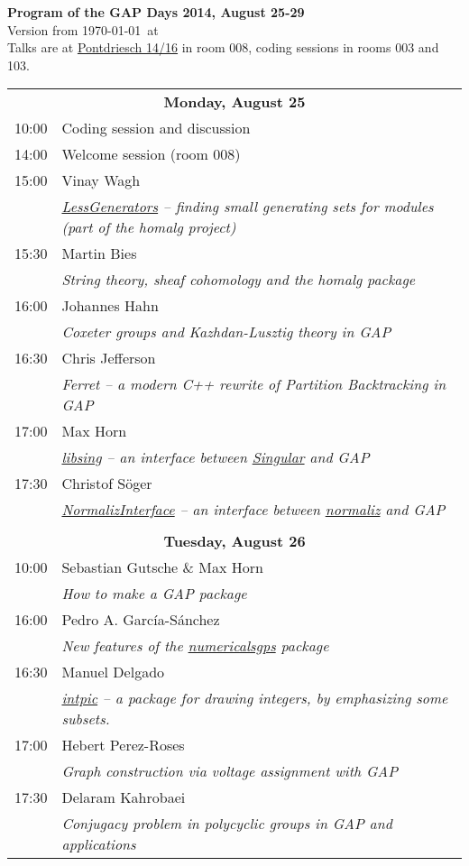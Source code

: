 \documentclass[12pt,a4paper]{article}
\begin{document}
\begin{center}
{\huge\textbf{Program of the GAP Days 2014, August 25-29}\\[2mm]}
Version from \today\ at \currenttime\\[2mm]
Talks are at \href{https://maps.google.com/maps?q=Pontdriesch+14,+Aachen,+Germany&hl=en&ll=50.778617,6.080579&spn=0.004993,0.008969&sll=37.0625,-95.677068&sspn=50.777825,73.476563&oq=pontdriesch+14+&hnear=Pontdriesch+14,+Mitte+52062+Aachen,+Germany&t=m&z=17}{Pontdriesch 14/16}
in room 008, coding sessions in rooms 003 and 103.
\end{center}

\newcommand{\vortrag}[3]{#1 & #2 \\ & \textit{#3} \\}

\newcommand{\newday}[1]{\multicolumn{2}{c}{{\large\textbf{#1}}} \\[1em]}


\begin{tabular}{rp{14.5cm}}
%
\newday{Monday, August 25}
10:00 & Coding session and discussion \\
14:00 & Welcome session (room 008) \\
\vortrag{15:00}{Vinay Wagh}{\href{https://github.com/homalg-project/LessGenerators}{LessGenerators} -- finding small generating sets for modules (part of the homalg project)}
\vortrag{15:30}{Martin Bies}{String theory, sheaf cohomology and the homalg package}
\vortrag{16:00}{Johannes Hahn}{Coxeter groups and Kazhdan-Lusztig theory in GAP}
\vortrag{16:30}{Chris Jefferson}{Ferret -- a modern C++ rewrite of Partition Backtracking in GAP}
\vortrag{17:00}{Max Horn}{\href{http://gap-system.github.io/libsing/}{libsing} -- an interface between \href{http://www.singular.uni-kl.de/}{Singular} and GAP}
\vortrag{17:30}{Christof Söger}{\href{https://github.com/fingolfin/NormalizInterface}{NormalizInterface} -- an interface between \href{http://www.math.uos.de/normaliz}{normaliz} and GAP}
%
%
\\
%
%
\newday{Tuesday, August 26}
\vortrag{10:00}{Sebastian Gutsche \& Max Horn}{How to make a GAP package}
\vortrag{16:00}{Pedro A. García-Sánchez
}{New features of the \href{http://www.gap-system.org/Packages/numericalsgps.html}{numericalsgps} package}
\vortrag{16:30}{Manuel Delgado}{\href{http://www.gap-system.org/Packages/intpic.html}{intpic} -- a package for drawing integers, by emphasizing some subsets.}
\vortrag{17:00}{Hebert Perez-Roses}{Graph construction via voltage assignment with GAP}
\vortrag{17:30}{Delaram Kahrobaei}{Conjugacy problem in polycyclic groups in GAP and applications}
%
%
\end{tabular}
\end{document}
